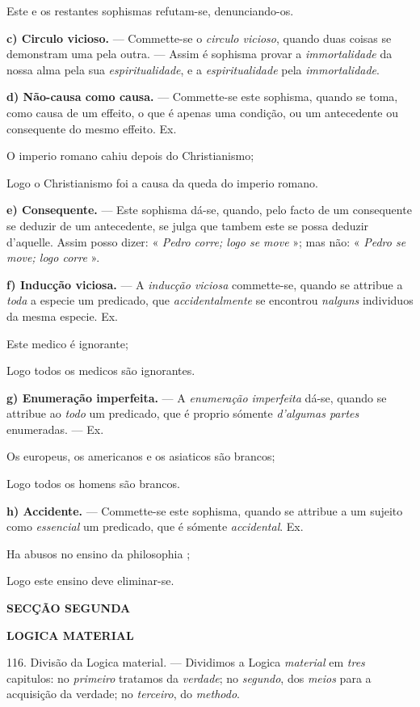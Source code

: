 Este e os restantes sophismas refutam-se, denunciando-os.

\textbf{c) Circulo vicioso.} --- Commette-se o \emph{circulo vicioso}, quando duas coisas se demonstram uma pela outra. --- Assim é sophisma provar a \emph{immortalidade} da nossa alma pela sua \emph{espiritualidade}, e a \emph{espiritualidade} pela \emph{immortalidade}.

\textbf{d) Não-causa como causa.} --- Commette-se este sophisma, quando se toma, como causa de um effeito, o que é apenas uma condição, ou um antecedente ou consequente do mesmo effeito. Ex.

O imperio romano cahiu depois do Christianismo;

Logo o Christianismo foi a causa da queda do imperio romano.

\textbf{e) Consequente.} --- Este sophisma dá-se, quando, pelo facto de um consequente se deduzir de um antecedente, se julga que tambem este se possa deduzir d'aquelle. Assim posso dizer: « \emph{Pedro corre; logo se move} »; mas não: « \emph{Pedro se move; logo corre} ».

\textbf{f) Inducção viciosa.} --- A \emph{inducção viciosa} commette-se, quando se attribue a \emph{toda} a especie um predicado, que \emph{accidentalmente} se encontrou \emph{nalguns} individuos da mesma especie. Ex.

Este medico é ignorante;

Logo todos os medicos são ignorantes.

\textbf{g) Enumeração imperfeita.} --- A \emph{enumeração imperfeita} dá-se, quando se attribue ao \emph{todo} um predicado, que é proprio sómente \emph{d'algumas partes} enumeradas. --- Ex.

Os europeus, os americanos e os asiaticos são brancos;

Logo todos os homens são brancos.

\textbf{h) Accidente.} --- Commette-se este sophisma, quando se attribue a um sujeito como \emph{essencial} um predicado, que é sómente \emph{accidental}. Ex.

Ha abusos no ensino da philosophia ;

Logo este ensino deve eliminar-se.

\textbf{SECÇÃO SEGUNDA}

\textbf{LOGICA MATERIAL}

116. Divisão da Logica material. --- Dividimos a Logica \emph{material} em \emph{tres} capitulos: no \emph{primeiro} tratamos da \emph{verdade}; no \emph{segundo}, dos \emph{meios} para a acquisição da verdade; no \emph{terceiro}, do \emph{methodo}.

